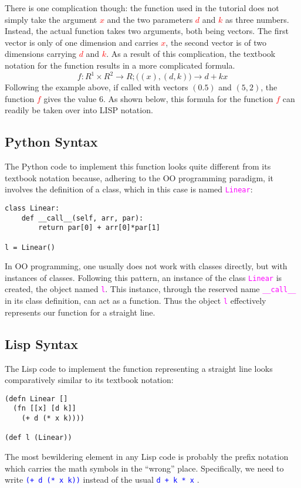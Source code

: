 \documentclass[twocolumn]{article}
\begin{document}
There is one complication though: the function used in the tutorial does not simply take the argument \textcolor{red}{$x$} and the two parameters \textcolor{red}{$d$} and \textcolor{red}{$k$} as three numbers. Instead, the actual function takes two arguments, both being vectors. The first vector is only of one dimension and carries \textcolor{red}{$x$}, the second vector is of two dimensions carrying \textcolor{red}{$d$} and \textcolor{red}{$k$}. As a result of this complication, the textbook notation for the function results in a more complicated formula.
{\color{red}
\begin{equation}
f\colon R^1 \times R^2 \rightarrow R; 
\bigl( \left( x \right), \left( d,k \right) \bigr) \rightarrow d + k x
\end{equation}}
Following the example above, if called with vectors $(0.5)$ and $(5, 2)$, the function \textcolor{red}{$f$} gives the value 6. As shown below, this formula for the function \textcolor{red}{$f$} can readily be taken over into LISP notation.

\subsection{Python Syntax}
The Python code to implement this function looks quite different from its textbook notation because, adhering to the OO programming paradigm, it involves the definition of a class, which in this case is named \texttt{\textcolor{magenta}{Linear}}:
{\color{magenta}\begin{verbatim}
class Linear:
    def __call__(self, arr, par):
        return par[0] + arr[0]*par[1]

l = Linear()
\end{verbatim}}
In OO programming, one usually does not work with classes directly, but with instances of classes. Following this pattern, an instance of the class \texttt{\textcolor{magenta}{Linear}} is created, the object named \texttt{\textcolor{magenta}{l}}. This instance, through the reserved name \texttt{\textcolor{magenta}{\_\_call\_\_}} in its class definition, can act as a function. Thus the object \texttt{\textcolor{magenta}{l}} effectively represents our function for a straight line.

\subsection{Lisp Syntax}
The Lisp code to implement the function representing a straight line looks comparatively similar to its textbook notation:
{\color{blue}\begin{verbatim}
(defn Linear []
  (fn [[x] [d k]]
    (+ d (* x k))))

(def l (Linear))
\end{verbatim}}
The most bewildering element in any Lisp code is probably the prefix notation which carries the math symbols in the “wrong” place. Specifically, we need to write \texttt{\textcolor{blue}{(+ d (* x k))}} instead of the usual \texttt{\textcolor{blue}{d + k * x}} .
\end{document}
